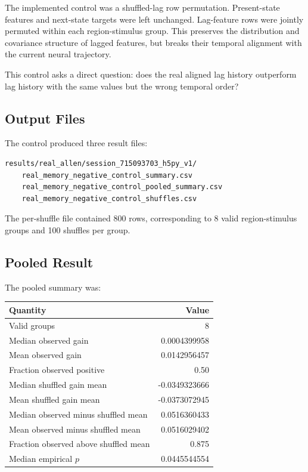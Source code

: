 The implemented control was a shuffled-lag row permutation. Present-state features and next-state targets were left unchanged. Lag-feature rows were jointly permuted within each region-stimulus group. This preserves the distribution and covariance structure of lagged features, but breaks their temporal alignment with the current neural trajectory.

This control asks a direct question: does the real aligned lag history outperform lag history with the same values but the wrong temporal order?

\subsection{Output Files}

The control produced three result files:

\begin{verbatim}
results/real_allen/session_715093703_h5py_v1/
    real_memory_negative_control_summary.csv
    real_memory_negative_control_pooled_summary.csv
    real_memory_negative_control_shuffles.csv
\end{verbatim}

The per-shuffle file contained 800 rows, corresponding to 8 valid region-stimulus groups and 100 shuffles per group.

\subsection{Pooled Result}

The pooled summary was:

\begin{center}
\begin{tabular}{lr}
\hline
Quantity & Value \\
\hline
Valid groups & 8 \\
Median observed gain & 0.0004399958 \\
Mean observed gain & 0.0142956457 \\
Fraction observed positive & 0.50 \\
Median shuffled gain mean & -0.0349323666 \\
Mean shuffled gain mean & -0.0373072945 \\
Median observed minus shuffled mean & 0.0516360433 \\
Mean observed minus shuffled mean & 0.0516029402 \\
Fraction observed above shuffled mean & 0.875 \\
Median empirical \(p\) & 0.0445544554 \\
\hline
\end{tabular}
\end{center}

